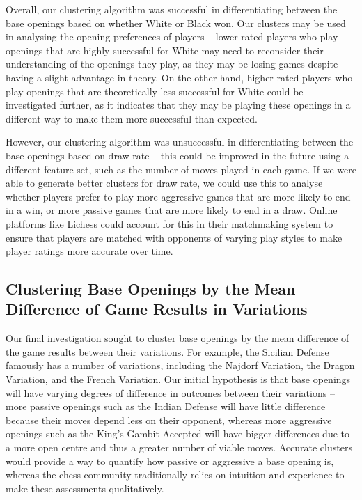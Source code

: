 \documentclass[a4paper, 11pt]{article}
\begin{document}
Overall, our clustering algorithm was successful in differentiating between the base openings based on whether White or Black won. Our clusters may be used in analysing the opening preferences of players -- lower-rated players who play openings that are highly successful for White may need to reconsider their understanding of the openings they play, as they may be losing games despite having a slight advantage in theory. On the other hand, higher-rated players who play openings that are theoretically less successful for White could be investigated further, as it indicates that they may be playing these openings in a different way to make them more successful than expected.

However, our clustering algorithm was unsuccessful in differentiating between the base openings based on draw rate -- this could be improved in the future using a different feature set, such as the number of moves played in each game. If we were able to generate better clusters for draw rate, we could use this to analyse whether players prefer to play more aggressive games that are more likely to end in a win, or more passive games that are more likely to end in a draw. Online platforms like Lichess could account for this in their matchmaking system to ensure that players are matched with opponents of varying play styles to make player ratings more accurate over time.

\subsection{Clustering Base Openings by the Mean Difference of Game Results in Variations}
Our final investigation sought to cluster base openings by the mean difference of the game results between their variations. For example, the Sicilian Defense famously has a number of variations, including the Najdorf Variation, the Dragon Variation, and the French Variation. Our initial hypothesis is that base openings will have varying degrees of difference in outcomes between their variations -- more passive openings such as the Indian Defense will have little difference because their moves depend less on their opponent, whereas more aggressive openings such as the King's Gambit Accepted will have bigger differences due to a more open centre and thus a greater number of viable moves. Accurate clusters would provide a way to quantify how passive or aggressive a base opening is, whereas the chess community traditionally relies on intuition and experience to make these assessments qualitatively.
\end{document}
